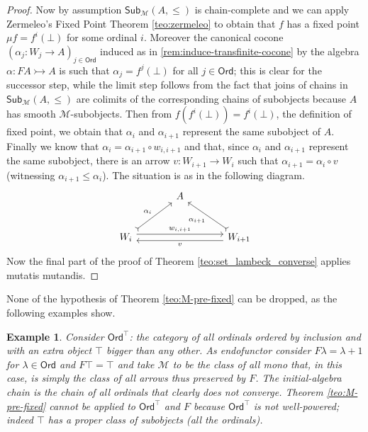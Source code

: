 \documentclass[letterpaper, 11pt, oneside]{memoir}
\theoremstyle{myteo}
\newtheorem{example}[theorem]{Example}
\numberwithin{equation}{section}
\newcommand{\Ord}{\textsf{Ord}}
\newcommand{\Sub}{\textsf{Sub}}
\begin{document}
\begin{proof}
  Now by assumption \(\Sub_{\mathcal{M}}(A, \leq)\) is chain-complete and we can apply Zermeleo's Fixed Point Theorem \ref{teo:zermeleo} to obtain that \(f\) has a fixed point \(\mu f = f^i(\bot)\) for some ordinal \(i\).
  Moreover the canonical cocone \((\alpha_j : W_j \to A)_{j\in\Ord}\) induced as in \ref{rem:induce-transfinite-cocone} by the algebra \(\alpha : FA \rightarrowtail A\) is such that \(\alpha_j = f^j(\bot)\) for all \(j \in \Ord\); this is clear for the successor step, while the limit step follows from the fact that joins of chains in \(\Sub_\mathcal{M}(A, \leq)\) are colimits of the corresponding chains of subobjects because \(A\) has smooth \(\mathcal{M}\)-subobjects.
  Then from \(f(f^i(\bot)) = f^i(\bot)\), the definition of fixed point, we obtain that \(\alpha_i\) and \(\alpha_{i+1}\) represent the same subobject of \(A\).
  Finally we know that \(\alpha_i = \alpha_{i+1} \circ w_{i, i+1}\) and that, since \(\alpha_i\) and \(\alpha_{i+1}\) represent the same subobject, there is an arrow \(v : W_{i+1} \to W_i\) such that \(\alpha_{i+1} = \alpha_i \circ v\) (witnessing \(\alpha_{i+1} \leq \alpha_i\)).
  The situation is as in the following diagram.
  \begin{equation*}
    \begin{tikzcd}[sep=large]
      & A & \\
      W_i \ar[ur, tail, "\alpha_i"] \ar[rr, shift left=.75ex, "w_{i, i+1}"] & & W_{i+1} \ar[lu, tail, "\alpha_{i+1}"] \ar[ll, shift left=.75ex, "v"]
    \end{tikzcd}
  \end{equation*}
  Now the final part of the proof of Theorem \ref{teo:set_lambeck_converse} applies mutatis mutandis.
\end{proof}

None of the hypothesis of Theorem \ref{teo:M-pre-fixed} can be dropped, as the following examples show.

\begin{example}
  Consider \(\Ord^\top\): the category of all ordinals ordered by inclusion and with an extra object \(\top\) bigger than any other.
  As endofunctor consider \(F\lambda = \lambda+1\) for \(\lambda \in \Ord\) and \(F\top = \top\) and take \(\mathcal{M}\) to be the class of all mono that, in this case, is simply the class of all arrows thus preserved by \(F\).
  The initial-algebra chain is the chain of all ordinals that clearly does not converge.
  Theorem \ref{teo:M-pre-fixed} cannot be applied to \(\Ord^\top\) and \(F\) because \(\Ord^\top\) is not well-powered; indeed \(\top\) has a proper class of subobjects (all the ordinals).
\end{example}
\end{document}
